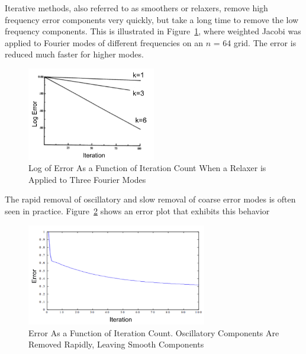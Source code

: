 Iterative methods, also referred to as smoothers or relaxers, remove high frequency error components very quickly, but take a long time to remove the low frequency components. This is illustrated in Figure~\ref{fig:FourierError}, where weighted Jacobi was applied to Fourier modes of different frequencies on an $n$ = 64 grid. The error is reduced much faster for higher modes. 
%
\begin{figure}[!ht]
    \begin{center}
      \includegraphics [width=0.5\textwidth, height=0.3\textheight] {FourierError}
   \end{center}
   \caption{Log of Error As a Function of Iteration Count When a Relaxer is Applied to Three Fourier Modes \cite{Briggs2000}}
   \label{fig:FourierError}
\end{figure}
%
The rapid removal of oscillatory and slow removal of coarse error modes is often seen in practice. Figure~\ref{fig:MGerrorExample} shows an error plot that exhibits this behavior
%
\begin{figure}[!ht]
    \begin{center}
      \includegraphics [width=0.7\textwidth, height=0.4\textheight] {MGerrorExample}
   \end{center}
   \caption{Error As a Function of Iteration Count. Oscillatory Components Are Removed Rapidly, Leaving Smooth Components \cite{Briggs2000}}
   \label{fig:MGerrorExample}
\end{figure}

